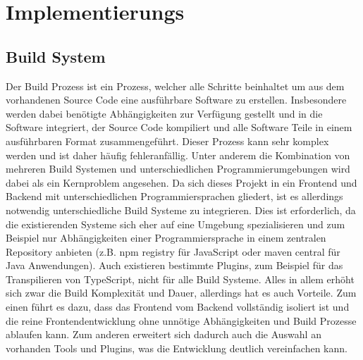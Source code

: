 \chapter{Implementierungs}

\section{Build System}
Der Build Prozess ist ein Prozess, welcher alle Schritte beinhaltet um aus dem vorhandenen Source Code eine ausführbare Software zu erstellen. Insbesondere werden dabei benötigte Abhängigkeiten zur Verfügung gestellt und in die Software integriert, der Source Code kompiliert und alle Software Teile in einem ausführbaren Format zusammengeführt. Dieser Prozess kann sehr komplex werden und ist daher häufig fehleranfällig. Unter anderem die Kombination von mehreren Build Systemen und unterschiedlichen Programmierumgebungen wird dabei als ein Kernproblem angesehen\cite{buildSystemProblem}. Da sich dieses Projekt in ein Frontend und Backend mit unterschiedlichen Programmiersprachen gliedert, ist es allerdings notwendig unterschiedliche Build Systeme zu integrieren. Dies ist erforderlich, da die existierenden Systeme sich eher auf eine Umgebung spezialisieren und zum Beispiel nur Abhängigkeiten einer Programmiersprache in einem zentralen Repository anbieten (z.B. npm registry für JavaScript oder maven central für Java Anwendungen). Auch existieren bestimmte Plugins, zum Beispiel für das Transpilieren von TypeScript, nicht für alle Build Systeme. Alles in allem erhöht sich zwar die Build Komplexität und Dauer, allerdings hat es auch Vorteile. Zum einen führt es dazu, dass das Frontend vom Backend vollständig isoliert ist und die reine Frontendentwicklung ohne unnötige Abhängigkeiten und Build Prozesse ablaufen kann. Zum anderen erweitert sich dadurch auch die Auswahl an vorhanden Tools und Plugins, was die Entwicklung deutlich vereinfachen kann.


